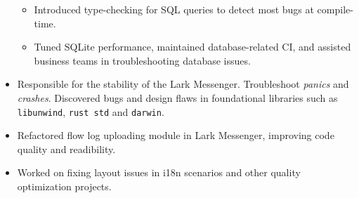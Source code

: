 \documentclass{resume}
\newcommand{\en}[1]{#1}
\newcommand{\zh}[1]{}
\begin{document}
\begin{itemize}
\begin{itemize}
{                        }
                        \zh{
                              开发了一个异步的 sqlite 连接池，相较于 \texttt{r2d2} 吞吐量更高。
                        }
                  \item \en{
                              Introduced type-checking for SQL queries to detect most bugs at compile-time.
                        }
                        \zh{
                              引入了 SQL 查询语句的类型检查机制，在编译时能发现大部分 bug。
                        }
                  \item \en{
                              Tuned SQLite performance, maintained database-related CI, 
                              and assisted business teams in troubleshooting database issues.
                        }
                        \zh{
                              进行 sqlite 调优，维护数据库相关 CI，协助业务方排查数据库相关的问题。
                        }
            \end{itemize}
      \item \en{
                Responsible for the stability of the Lark Messenger. Troubleshoot \textit{panics} and \textit{crashes}.
                Discovered bugs and design flaws in foundational libraries such as \texttt{libunwind}, \texttt{rust std} and \texttt{darwin}.
            }
            \zh{
                负责飞书客户端的稳定性，包括定位并修复 \textit{panic} 和 \textit{crash}。
                在定位过程中发现了 \texttt{libunwind}、\texttt{rust std} 和 \texttt{darwin} 等基础库的一些 bug 和设计缺陷。
            }
      \item \en{
                Refactored flow log uploading module in Lark Messenger, improving code quality and readibility.
            }
            \zh{
                重构了飞书的日志上传模块，提升了代码质量和可读性。
            }
\end{itemize}

\en{}
\zh{\datedsubsection{\textbf{\href{https://www.bytedance.com/}{字节跳动}}}{04/2020 -- 07/2020}}
\en{}
\zh{\role{飞书}{iOS 研发实习}}
\begin{itemize}
      \item \en{Worked on fixing layout issues in i18n scenarios and other quality optimization projects.}
            \zh{主要任务为国际化场景下 iOS 端的布局问题的修复等品质优化相关项目。}
\end{itemize}
\end{document}
